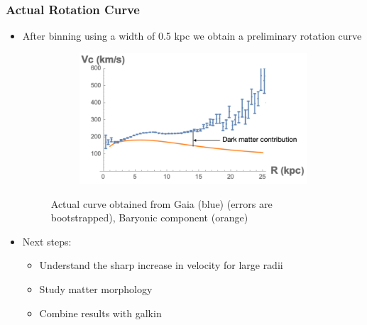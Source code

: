 \documentclass{beamer}
\begin{document}
\begin{frame}
\frametitle{Actual Rotation Curve}
\begin{itemize}
\item After binning using a width of 0.5 kpc we obtain a preliminary rotation curve

\begin{figure}[h!]
  \centering
  \begin{subfigure}[b]{0.6\linewidth}
    \includegraphics[width=\linewidth]{RotCurvAftBin3}
  \end{subfigure}
    \caption{Actual curve obtained from Gaia (blue) (errors are bootstrapped), Baryonic component (orange)}
\end{figure}

\item Next steps:
\begin{itemize}

\item Understand the sharp increase in velocity for large radii
\item Study matter morphology
\item Combine results with galkin
 \end{itemize}


\end{itemize}
\end{frame}







\end{document}
